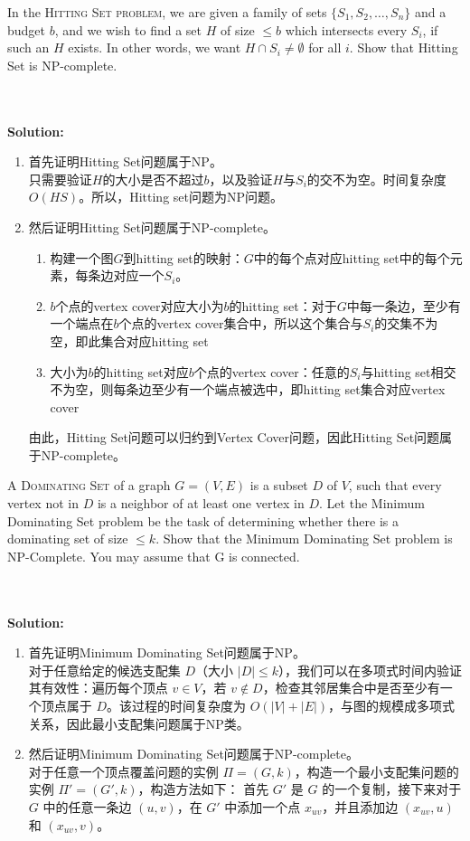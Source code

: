 \documentclass{article}
\newcounter{exercise}
\newcommand{\<}{
    \langle}
\renewcommand{\>}{
    \rangle}
\begin{document}
{\begin{exercise}
In the \textsc{Hitting Set problem}, we are given a family of sets $\{S_1,S_2,\ldots, S_n\}$ and a budget $b$, and we wish to find a set $H$ of size $\leq b$ which intersects every $S_i$, if such an $H$ exists. In other words, we want $H\cap S_i\neq\emptyset$ for all $i$.
Show that Hitting Set is NP-complete.
\end{exercise}
\\\\
\noindent\textbf{Solution:}
\begin{enumerate}
    \item 首先证明Hitting Set问题属于NP。\\
    只需要验证$H$的大小是否不超过$b$，以及验证$H$与$S_i$的交不为空。时间复杂度$O(HS)$。所以，Hitting set问题为NP问题。
    \item 然后证明Hitting Set问题属于NP-complete。
        \begin{enumerate}
            \item 构建一个图$G$到hitting set的映射：$G$中的每个点对应hitting set中的每个元素，每条边对应一个$S_i$。
            \item $b$个点的vertex cover对应大小为$b$的hitting set：对于$G$中每一条边，至少有一个端点在$b$个点的vertex cover集合中，所以这个集合与$S_i$的交集不为空，即此集合对应hitting set
            \item 大小为$b$的hitting set对应$b$个点的vertex cover：任意的$S_i$与hitting set相交不为空，则每条边至少有一个端点被选中，即hitting set集合对应vertex cover
        \end{enumerate}
        由此，Hitting Set问题可以归约到Vertex Cover问题，因此Hitting Set问题属于NP-complete。
\end{enumerate}

\begin{exercise}
A \textsc{Dominating Set} of a graph $G = (V, E)$ is a subset $D$ of $V$, such that every vertex not in $D$
is a neighbor of at least one vertex in $D$. Let the Minimum Dominating Set problem be the
task of determining whether there is a dominating set of size  $\leq k$. Show that the Minimum
Dominating Set problem is NP-Complete. You may assume that G is connected.
\end{exercise}
\\\\
\noindent\textbf{Solution:}
\begin{enumerate}
    \item 首先证明Minimum Dominating Set问题属于NP。\\
    对于任意给定的候选支配集 $D$（大小 $|D| \leq k$），我们可以在多项式时间内验证其有效性：遍历每个顶点 $v \in V$，若 $v \notin D$，检查其邻居集合中是否至少有一个顶点属于 $D$。该过程的时间复杂度为 $O(|V| + |E|)$，与图的规模成多项式关系，因此最小支配集问题属于NP类。
    \item 然后证明Minimum Dominating Set问题属于NP-complete。\\
    对于任意一个顶点覆盖问题的实例 $\Pi = (G, k)$，构造一个最小支配集问题的实例 $\Pi' = (G', k)$，构造方法如下：
    首先 $G'$ 是 $G$ 的一个复制，接下来对于 $G$ 中的任意一条边 $(u, v)$，在 $G'$ 中添加一个点 $x_{uv}$，并且添加边 $(x_{uv}, u)$ 和 $(x_{uv}, v)$。


\end{enumerate}}
\end{document}
